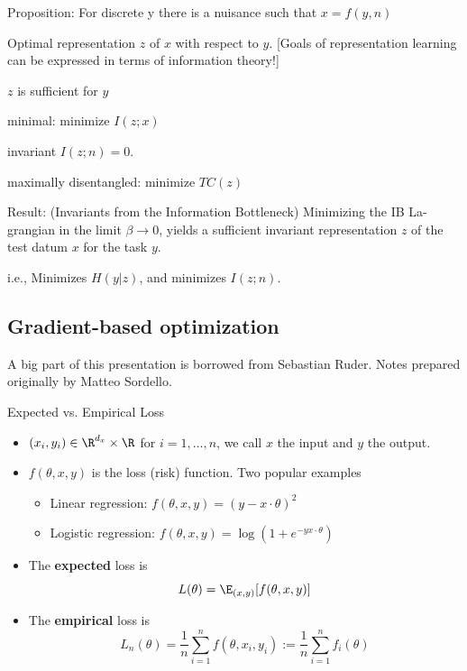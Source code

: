 \documentclass[english]{article}
\begin{document}
Proposition: For discrete y there is a nuisance such that $x=f(y,n)$

\item Optimal representation $z$ of $x$ with respect to $y$. [Goals of representation learning can be expressed in terms of information theory!]

\benum 
\item $z$ is sufficient for $y$


\item minimal: minimize $I(z;x)$
\item invariant $I(z;n)=0$.
\item maximally disentangled: minimize $TC(z)$

\eenum 
\item Result: (Invariants from the Information Bottleneck) Minimizing the IB La-
grangian in the limit $\beta \to 0$, yields a sufficient invariant representation $z$ of the test datum $x$ for the task $y$.

i.e., Minimizes $H(y|z)$, and  minimizes $I(z;n)$.

\eitem 


\subsection{Gradient-based optimization}

\benum 

\item A big part of this presentation is borrowed from Sebastian Ruder. Notes prepared originally by Matteo Sordello.




\item {Expected vs. Empirical Loss}
\begin{itemize}
\item $(x_i, y_i) \in \R^{d_x} \times \R$ for $i = 1,..., n$, we call $x$ the input and $y$ the output. 
\item $f(\theta, x, y)$ is the loss (risk) function. Two popular examples
\begin{itemize}
\item Linear regression: $f(\theta, x, y) = (y - x\cdot\theta)^2$ 
\item Logistic regression: $f(\theta, x, y) = \log(1+e^{-y x \cdot\theta})$
\end{itemize} 


\item The \textbf{expected} loss is
$$L(\theta) = \E_{(x, y)}[f(\theta, x, y)]$$ 


\item The \textbf{empirical} loss is
$$L_n(\theta) = \frac1n \sum_{i=1}^n f(\theta, x_i, y_i) := \frac1n \sum_{i=1}^n f_i(\theta)$$
\end{itemize}
\end{document}
